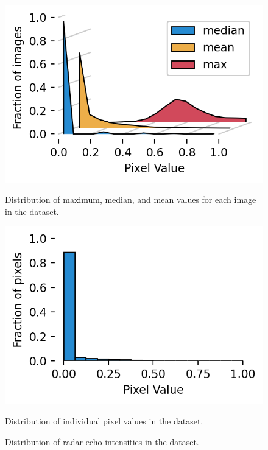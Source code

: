 \begin{figure}[ht]
    \centering
    \begin{subcaptionblock}[t]{.45\textwidth}
        \centering
        \includegraphics[width=\textwidth]{images/hist_dataset.png}
        \caption[Distribution maximum, median, and mean values for each image in the dataset]{\label{fig:hist_dataset}Distribution of maximum, median, and mean values for each image in the dataset.}
    \end{subcaptionblock}
    \hspace{1em}
    \begin{subcaptionblock}[t]{.45\textwidth}
        \centering
        \includegraphics[width=\textwidth]{images/hist_dataset_pixels.png}
        \caption[Distribution of pixel values in the dataset]{Distribution of individual pixel values in the dataset.}
    \end{subcaptionblock}
    \caption[Distribution of radar echo intensities in the dataset]{Distribution of radar echo intensities in the dataset.}
\end{figure}

